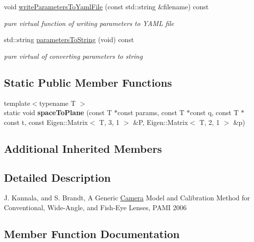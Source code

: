 \begin{DoxyCompactItemize}
void \hyperlink{classcamodocal_1_1EquidistantCamera_ae3142aaa34373807d929de2750e28f7a}{write\+Parameters\+To\+Yaml\+File} (const std\+::string \&filename) const
\begin{DoxyCompactList}\small\item\em pure virtual function of writing parameters to Y\+A\+ML file \end{DoxyCompactList}\item 
\mbox{\label{classcamodocal_1_1EquidistantCamera_ab78b5a61b2e68bbde6b863f4538f544e}} 
std\+::string \hyperlink{classcamodocal_1_1EquidistantCamera_ab78b5a61b2e68bbde6b863f4538f544e}{parameters\+To\+String} (void) const
\begin{DoxyCompactList}\small\item\em pure virtual of converting parameters to string \end{DoxyCompactList}\end{DoxyCompactItemize}
\subsection*{Static Public Member Functions}
\begin{DoxyCompactItemize}
\item 
\mbox{\label{classcamodocal_1_1EquidistantCamera_aafd0587cb4f994cb26a10b025802f377}} 
{\footnotesize template$<$typename T $>$ }\\static void {\bfseries space\+To\+Plane} (const T $\ast$const params, const T $\ast$const q, const T $\ast$const t, const Eigen\+::\+Matrix$<$ T, 3, 1 $>$ \&P, Eigen\+::\+Matrix$<$ T, 2, 1 $>$ \&p)
\end{DoxyCompactItemize}
\subsection*{Additional Inherited Members}


\subsection{Detailed Description}
J. Kannala, and S. Brandt, A Generic \hyperlink{classcamodocal_1_1Camera}{Camera} Model and Calibration Method for Conventional, Wide-\/\+Angle, and Fish-\/\+Eye Lenses, P\+A\+MI 2006 

\subsection{Member Function Documentation}
\mbox{\label{classcamodocal_1_1EquidistantCamera_accd38ebf90227cc221d91dad7dd57dbb}} 
